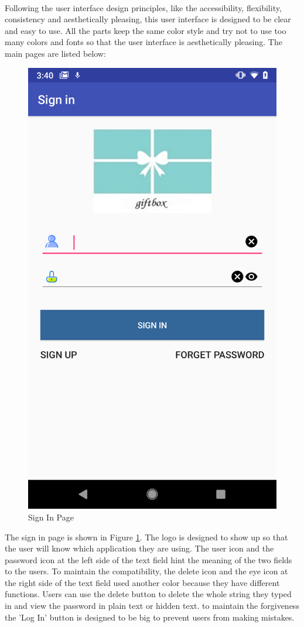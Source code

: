 \paragraph{}Following the user interface design principles, like the accessibility, flexibility, consistency and aesthetically pleasing, this user interface is designed to be clear and easy to use. All the parts keep the same color style and try not to use too many colors and fonts so that the user interface is aesthetically pleasing. The main pages are listed below:
\begin{figure}[htb]
\centering
\includegraphics[width=.27\textwidth]{section03/assets/SignIn.png}
\caption[Short Caption 2]{\label{SignInUI}Sign In Page}
\end{figure}
\par The sign in page is shown in Figure \ref{SignInUI}. The logo is designed to show up so that the user will know which application they are using. The user icon and the password icon at the left side of the text field hint the meaning of the two fields to the users. To maintain the compatibility, the delete icon and the eye icon at the right side of the text field used another color because they have different functions. Users can use the delete button to delete the whole string they typed in and view the password in plain text or hidden text. to maintain the forgiveness the 'Log In' button is designed to be big to prevent users from making mistakes. 

